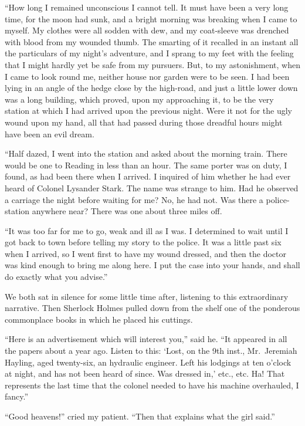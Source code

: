 “How long I remained unconscious I cannot tell. It must
have been a very long time, for the moon had sunk, and a
bright morning was breaking when I came to myself. My
clothes were all sodden with dew, and my coat-sleeve was
drenched with blood from my wounded thumb. The smarting
of it recalled in an instant all the particulars of my night’s
adventure, and I sprang to my feet with the feeling that I
might hardly yet be safe from my pursuers. But, to my astonishment,
when I came to look round me, neither house nor
garden were to be seen. I had been lying in an angle of the
hedge close by the high-road, and just a little lower down was
a long building, which proved, upon my approaching it, to be
the very station at which I had arrived upon the previous
night. Were it not for the ugly wound upon my hand, all
that had passed during those dreadful hours might have been
an evil dream.

“Half dazed, I went into the station and asked about the
morning train. There would be one to Reading in less than
an hour. The same porter was on duty, I found, as had been
there when I arrived. I inquired of him whether he had ever
heard of Colonel Lysander Stark. The name was strange to
him. Had he observed a carriage the night before waiting
for me? No, he had not. Was there a police-station anywhere
near? There was one about three miles off.

“It was too far for me to go, weak and ill as I was. I determined
to wait until I got back to town before telling my
story to the police. It was a little past six when I arrived, so
I went first to have my wound dressed, and then the doctor
was kind enough to bring me along here. I put the case into
your hands, and shall do exactly what you advise.”

We both sat in silence for some little time after, listening to
this extraordinary narrative. Then Sherlock Holmes pulled
down from the shelf one of the ponderous commonplace
books in which he placed his cuttings.

“Here is an advertisement which will interest you,” said
he. “It appeared in all the papers about a year ago. Listen
to this: ‘Lost, on the 9th inst., Mr.~Jeremiah Hayling, aged
twenty-six, an hydraulic engineer. Left his lodgings at ten
o’clock at night, and has not been heard of since. Was
dressed in,’ etc., etc. Ha! That represents the last time
that the colonel needed to have his machine overhauled, I
fancy.”

“Good heavens!” cried my patient. “Then that explains
what the girl said.”

